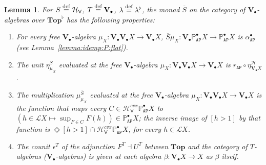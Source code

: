 \documentclass[preprint,12pt]{elsarticle}
\newcommand\eqdef{\mathrel{\buildrel \text{def}\over=}}
\newcommand\Lform{\mathcal L}
\newcommand\Pred{\mathbb{P}}
\newcommand\Angel{{\mathtt{A}}}
\newcommand\Nature{{\mathtt{P}}}
\newcommand\AN{{\Angel\Nature}}
\newcommand\Hoare{{\mathcal H}}
\newcommand\Vt{\mathsf{V}}
\newcommand\HV{\Hoare_\Vt}
\newcommand\Val{{\mathbf V}}
\newcommand\Topcat{\mathbf{Top}}
\newtheorem{lemma}[theorem]{Lemma}
\begin{document}
\begin{lemma}
  \label{lemma:Sbar:flat}
  For $S \eqdef \HV$, $T \eqdef \Val_\bullet$,
  $\lambda \eqdef \lambda^\flat$, the monad $\overline S$ on the
  category of $\Val_\bullet$-algebras over $\Topcat^\flat$ has the
  following properties:
  \begin{enumerate}
  \item For every free $\Val_\bullet$-algebra
    $\mu_X \colon \Val_\bullet {\Val_\bullet X} \to \Val_\bullet X$,
    $\overline S \mu_X \colon \Val_\bullet {\Pred_\AN^\bullet X} \to
    \Pred_\AN^\bullet X$ is $\alpha_\AN^\bullet$ (see
    Lemma~\ref{lemma:idemp:P:flat}).
  \item The unit $\eta^{\overline S}_{\mu_X}$ evaluated at the free
    $\Val_\bullet$-algebra
    $\mu_X \colon \Val_\bullet {\Val_\bullet X} \to \Val_\bullet X$ is
    $r_\AN \circ \eta^\Hoare_{\Val_\bullet X}$.
  \item The multiplication $\mu^{\overline S}_{\mu_X}$ evaluated at
    the free $\Val_\bullet$-algebra
    $\mu_X \colon \Val_\bullet {\Val_\bullet X} \to \Val_\bullet X$ is
    the function that maps every $C \in \HV^{cvx} {\Pred_\AN^\bullet
      X}$ to $(h \in \Lform X \mapsto \sup_{F \in C} F (h)) \in
    \Pred_\AN^\bullet X$; the inverse image of $[h > 1]$ by that
    function is $\Diamond {[h > 1]} \cap \HV^{cvx} {\Pred_\AN^\bullet X}$,
    for every $h \in \Lform X$.
  \item The counit $\epsilon^T$ of the adjunction $F^T \dashv U^T$
    between $\Topcat$ and the category of $T$-algebras
    ($\Val_\bullet$-algebras) is given at each algebra $\beta \colon
    \Val_\bullet X \to X$ as $\beta$ itself.
  \end{enumerate}
\end{lemma}
\end{document}
